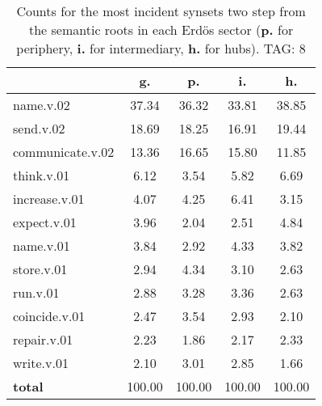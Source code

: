\begin{table}[h!]
\begin{center}
\begin{tabular}{| l || c | c | c | c |}\hline
 & {\bf g.} & {\bf p.} & {\bf i.} & {\bf h.} \\\hline\hline
name.v.02 & 37.34  & 36.32  & 33.81  & 38.85 \\\hline
send.v.02 & 18.69  & 18.25  & 16.91  & 19.44 \\\hline
communicate.v.02 & 13.36  & 16.65  & 15.80  & 11.85 \\\hline
think.v.01 & 6.12  & 3.54  & 5.82  & 6.69 \\\hline
increase.v.01 & 4.07  & 4.25  & 6.41  & 3.15 \\\hline
expect.v.01 & 3.96  & 2.04  & 2.51  & 4.84 \\\hline
name.v.01 & 3.84  & 2.92  & 4.33  & 3.82 \\\hline
store.v.01 & 2.94  & 4.34  & 3.10  & 2.63 \\\hline
run.v.01 & 2.88  & 3.28  & 3.36  & 2.63 \\\hline
coincide.v.01 & 2.47  & 3.54  & 2.93  & 2.10 \\\hline
repair.v.01 & 2.23  & 1.86  & 2.17  & 2.33 \\\hline
write.v.01 & 2.10  & 3.01  & 2.85  & 1.66 \\\hline\hline
{{\bf total}} & 100.00  & 100.00  & 100.00  & 100.00 \\\hline
\end{tabular}
\caption{Counts for the most incident synsets two step from the semantic roots in each Erd\"os sector ({\bf p.} for periphery, {\bf i.} for intermediary, {\bf h.} for hubs). TAG: 8}
\end{center}
\end{table}